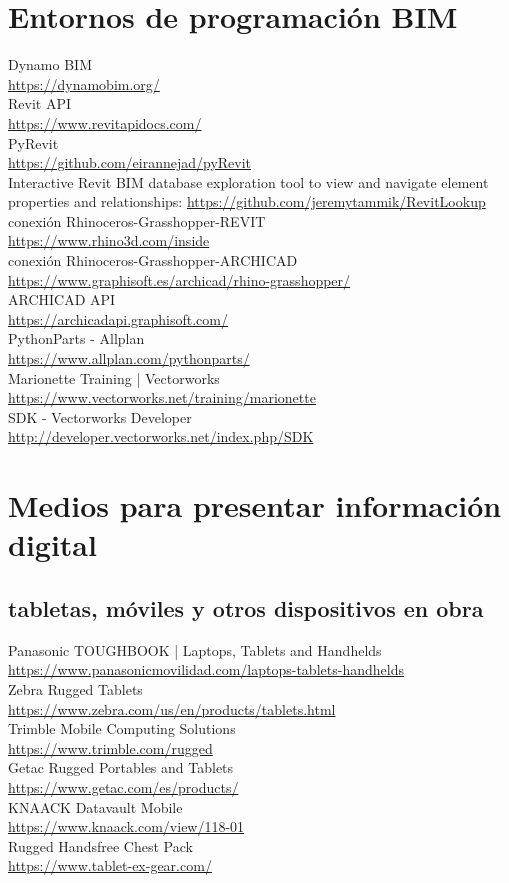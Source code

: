\documentclass[spanish,12pt,a4paper,final,oneside]{book}
\begin{document}
\section{Entornos de programación BIM}
Dynamo BIM \\ \url{https://dynamobim.org/}
\\ Revit API \\ \url{https://www.revitapidocs.com/}
\\ PyRevit \\ \url{https://github.com/eirannejad/pyRevit}
\\ Interactive Revit BIM database exploration tool to view and navigate element properties and relationships:  \url{https://github.com/jeremytammik/RevitLookup}
\\ conexión Rhinoceros-Grasshopper-REVIT  \\ \url{https://www.rhino3d.com/inside}
\\ conexión Rhinoceros-Grasshopper-ARCHICAD \\ \url{https://www.graphisoft.es/archicad/rhino-grasshopper/}
\\ ARCHICAD API \\ \url{https://archicadapi.graphisoft.com/}
\\ PythonParts - Allplan \\ \url{https://www.allplan.com/pythonparts/}
\\ Marionette Training | Vectorworks \\ \url{https://www.vectorworks.net/training/marionette}
\\ SDK - Vectorworks Developer \\ \url{http://developer.vectorworks.net/index.php/SDK}

\section{Medios para presentar información digital}

\subsection{tabletas, móviles y otros dispositivos en obra}
Panasonic TOUGHBOOK | Laptops, Tablets and Handhelds  \\ \url{https://www.panasonicmovilidad.com/laptops-tablets-handhelds}
\\ Zebra Rugged Tablets  \\ \url{https://www.zebra.com/us/en/products/tablets.html}
\\ Trimble Mobile Computing Solutions \\ \url{https://www.trimble.com/rugged}
\\ Getac Rugged Portables and Tablets\\ \url{https://www.getac.com/es/products/}
\\ KNAACK Datavault Mobile \\ \url{https://www.knaack.com/view/118-01}
\\ Rugged Handsfree Chest Pack \\ \url{https://www.tablet-ex-gear.com/}
\end{document}
